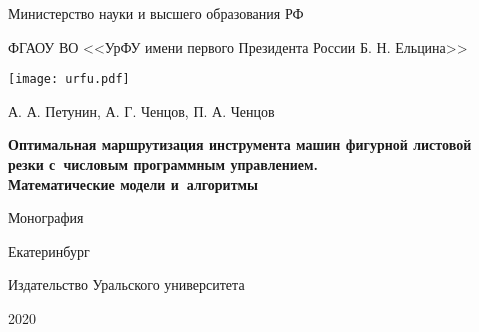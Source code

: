 
\thispagestyle{empty}

\setcounter{page}{1}
\begin{center}
{\small
Министерство науки и высшего образования РФ

ФГАОУ ВО <<УрФУ имени первого Президента России 
Б. Н. Ельцина>>
}
\texttt{[image: urfu.pdf]}

\vspace{0pt plus2fill}
А. А. Петунин,
А. Г. Ченцов,
П. А. Ченцов

\vspace{0pt plus1fill}
{\bf
Оптимальная маршрутизация инструмента машин фигурной
листовой резки с~числовым
программным управлением.\\
Математические модели и~алгоритмы}

\vspace{3cm}
Монография

\vspace{0pt plus6fill}
Екатеринбург

Издательство Уральского университета

2020
\end{center}
\newpage
